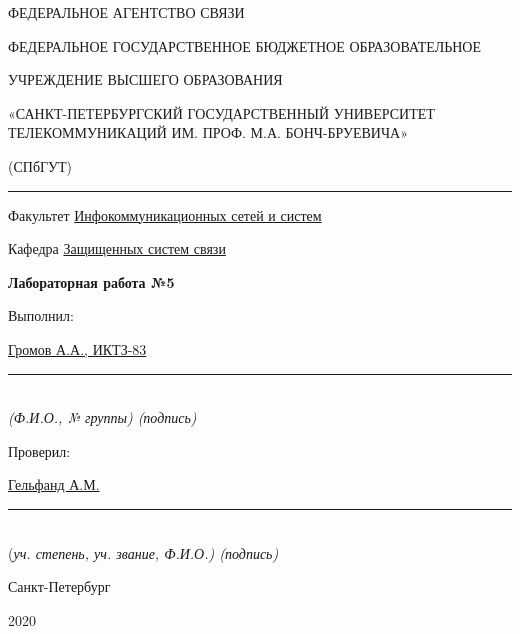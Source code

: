 \documentclass[a4paper,14pt]{extarticle}
\begin{document}
    \begin{center}
        \thispagestyle{empty}
        \begin{singlespace}
        ФЕДЕРАЛЬНОЕ АГЕНТСТВО СВЯЗИ

        ФЕДЕРАЛЬНОЕ ГОСУДАРСТВЕННОЕ БЮДЖЕТНОЕ ОБРАЗОВАТЕЛЬНОЕ

        УЧРЕЖДЕНИЕ ВЫСШЕГО ОБРАЗОВАНИЯ

        «САНКТ-ПЕТЕРБУРГСКИЙ ГОСУДАРСТВЕННЫЙ УНИВЕРСИТЕТ ТЕЛЕКОММУНИКАЦИЙ ИМ. ПРОФ. М.А. БОНЧ-БРУЕВИЧА»

        (СПбГУТ)
        \end{singlespace}
        \vspace{-1ex}
        \rule{\textwidth}{0.4pt}
        \vspace{-5ex}

        Факультет \underline{Инфокоммуникационных сетей и систем}

        Кафедра \underline{Защищенных систем связи}
        \vspace{10ex}

        \textbf{Лабораторная работа №5}

    \end{center}
    \vspace{4ex}
    \begin{flushright}
    \parbox{8cm}{
    \begin{flushleft}
        Выполнил:

        \underline{Громов А.А., ИКТЗ-83} \hfill \rule[-0.85ex]{0.1\textwidth}{0.6pt}\\
        \vspace{-1ex}
        \footnotesize \textit{ (Ф.И.О., № группы) \hfill (подпись)} \normalsize

        Проверил:

        \underline{Гельфанд А.М.} \hfill \rule[-0.85ex]{0.1\textwidth}{0.6pt}\\
        \vspace{-1ex}
        (\footnotesize \textit{уч. степень, уч. звание, Ф.И.О.) \hfill (подпись)} \normalsize

    \end{flushleft}
    }
    \end{flushright}
    \begin{center}
        \vfill
        Санкт-Петербург

        2020

        \end{center}
\end{document}
